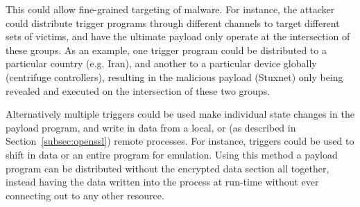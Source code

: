 This could allow fine-grained targeting of malware. For instance, the attacker
could distribute trigger programs through different channels to target different sets
of victims, and have the ultimate payload only operate at the intersection of
these groups. As an example, one trigger program could be distributed to a
particular country (e.g. Iran), and another to a particular device globally
(centrifuge controllers), resulting in the malicious payload (Stuxnet) only
being revealed and executed on the intersection of these two groups.


\smallskip

Alternatively multiple triggers could be used make individual state changes in
the payload program, and write in data from a local, or (as described in
Section~\ref{subsec:openssl}) remote processes. For instance, triggers could be
used to shift in data or an entire program for emulation.
Using this method a payload
program can be distributed without the encrypted data section all together,
instead having the data written into the process at run-time without ever
connecting out to any other resource.


